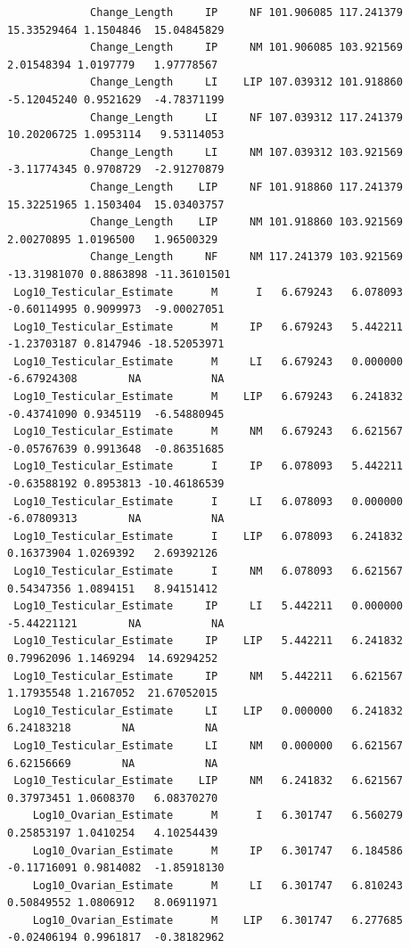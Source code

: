 \documentclass[
  landscape]{article}
\begin{document}
\begin{verbatim}
             Change_Length     IP     NF 101.906085 117.241379  15.33529464 1.1504846  15.04845829
             Change_Length     IP     NM 101.906085 103.921569   2.01548394 1.0197779   1.97778567
             Change_Length     LI    LIP 107.039312 101.918860  -5.12045240 0.9521629  -4.78371199
             Change_Length     LI     NF 107.039312 117.241379  10.20206725 1.0953114   9.53114053
             Change_Length     LI     NM 107.039312 103.921569  -3.11774345 0.9708729  -2.91270879
             Change_Length    LIP     NF 101.918860 117.241379  15.32251965 1.1503404  15.03403757
             Change_Length    LIP     NM 101.918860 103.921569   2.00270895 1.0196500   1.96500329
             Change_Length     NF     NM 117.241379 103.921569 -13.31981070 0.8863898 -11.36101501
 Log10_Testicular_Estimate      M      I   6.679243   6.078093  -0.60114995 0.9099973  -9.00027051
 Log10_Testicular_Estimate      M     IP   6.679243   5.442211  -1.23703187 0.8147946 -18.52053971
 Log10_Testicular_Estimate      M     LI   6.679243   0.000000  -6.67924308        NA           NA
 Log10_Testicular_Estimate      M    LIP   6.679243   6.241832  -0.43741090 0.9345119  -6.54880945
 Log10_Testicular_Estimate      M     NM   6.679243   6.621567  -0.05767639 0.9913648  -0.86351685
 Log10_Testicular_Estimate      I     IP   6.078093   5.442211  -0.63588192 0.8953813 -10.46186539
 Log10_Testicular_Estimate      I     LI   6.078093   0.000000  -6.07809313        NA           NA
 Log10_Testicular_Estimate      I    LIP   6.078093   6.241832   0.16373904 1.0269392   2.69392126
 Log10_Testicular_Estimate      I     NM   6.078093   6.621567   0.54347356 1.0894151   8.94151412
 Log10_Testicular_Estimate     IP     LI   5.442211   0.000000  -5.44221121        NA           NA
 Log10_Testicular_Estimate     IP    LIP   5.442211   6.241832   0.79962096 1.1469294  14.69294252
 Log10_Testicular_Estimate     IP     NM   5.442211   6.621567   1.17935548 1.2167052  21.67052015
 Log10_Testicular_Estimate     LI    LIP   0.000000   6.241832   6.24183218        NA           NA
 Log10_Testicular_Estimate     LI     NM   0.000000   6.621567   6.62156669        NA           NA
 Log10_Testicular_Estimate    LIP     NM   6.241832   6.621567   0.37973451 1.0608370   6.08370270
    Log10_Ovarian_Estimate      M      I   6.301747   6.560279   0.25853197 1.0410254   4.10254439
    Log10_Ovarian_Estimate      M     IP   6.301747   6.184586  -0.11716091 0.9814082  -1.85918130
    Log10_Ovarian_Estimate      M     LI   6.301747   6.810243   0.50849552 1.0806912   8.06911971
    Log10_Ovarian_Estimate      M    LIP   6.301747   6.277685  -0.02406194 0.9961817  -0.38182962

\end{verbatim}
\end{document}
